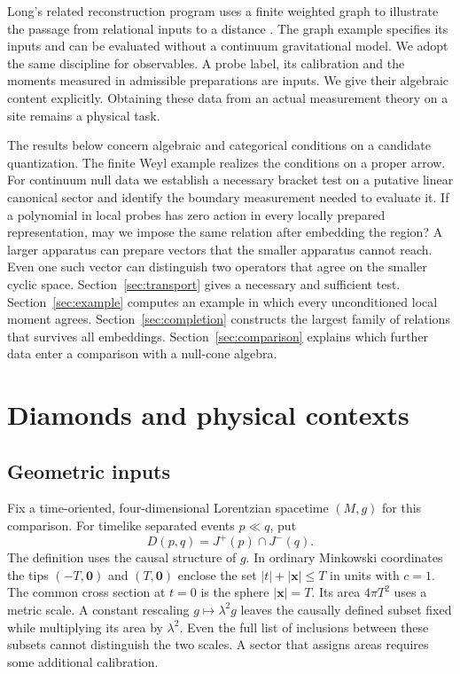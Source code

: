 \documentclass[11pt,letterpaper]{article}
\begin{document}
Long's related reconstruction program uses a finite weighted graph to illustrate the passage from relational inputs to a distance \cite[Sec.~5]{cond}. The graph example specifies its inputs and can be evaluated without a continuum gravitational model. We adopt the same discipline for observables. A probe label, its calibration and the moments measured in admissible preparations are inputs. We give their algebraic content explicitly. Obtaining these data from an actual measurement theory on a site remains a physical task.

The results below concern algebraic and categorical conditions on a candidate quantization. The finite Weyl example realizes the conditions on a proper arrow. For continuum null data we establish a necessary bracket test on a putative linear canonical sector and identify the boundary measurement needed to evaluate it. If a polynomial in local probes has zero action in every locally prepared representation, may we impose the same relation after embedding the region? A larger apparatus can prepare vectors that the smaller apparatus cannot reach. Even one such vector can distinguish two operators that agree on the smaller cyclic space. Section~\ref{sec:transport} gives a necessary and sufficient test. Section~\ref{sec:example} computes an example in which every unconditioned local moment agrees. Section~\ref{sec:completion} constructs the largest family of relations that survives all embeddings. Section~\ref{sec:comparison} explains which further data enter a comparison with a null-cone algebra.

\section{Diamonds and physical contexts}
\label{sec:diamonds}

\subsection{Geometric inputs}

Fix a time-oriented, four-dimensional Lorentzian spacetime $(M,g)$ for this comparison. For timelike separated events $p\ll q$, put
\[
 D(p,q)=J^+(p)\cap J^-(q).
\]
The definition uses the causal structure of $g$. In ordinary Minkowski coordinates the tips $( -T,\boldsymbol 0)$ and $(T,\boldsymbol 0)$ enclose the set $|t|+|\boldsymbol x|\le T$ in units with $c=1$. The common cross section at $t=0$ is the sphere $|\boldsymbol x|=T$. Its area $4\pi T^2$ uses a metric scale. A constant rescaling $g\mapsto\lambda^2 g$ leaves the causally defined subset fixed while multiplying its area by $\lambda^2$. Even the full list of inclusions between these subsets cannot distinguish the two scales. A sector that assigns areas requires some additional calibration.
\end{document}
